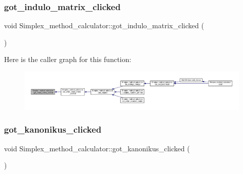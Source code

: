 \subsubsection{\texorpdfstring{got\+\_\+indulo\+\_\+matrix\+\_\+clicked}{got\_indulo\_matrix\_clicked}}
{\footnotesize\ttfamily void Simplex\+\_\+method\+\_\+calculator\+::got\+\_\+indulo\+\_\+matrix\+\_\+clicked (\begin{DoxyParamCaption}{ }\end{DoxyParamCaption})\hspace{0.3cm}{\ttfamily [signal]}}

Here is the caller graph for this function\+:\nopagebreak
\begin{figure}[H]
\begin{center}
\leavevmode
\includegraphics[width=350pt]{classSimplex__method__calculator_a4b3ebd66ccdae0e7750932c3d0538a5c_icgraph}
\end{center}
\end{figure}
\mbox{\label{classSimplex__method__calculator_a078f1874b0679d00afb935543b2c7da7}} 
\subsubsection{\texorpdfstring{got\+\_\+kanonikus\+\_\+clicked}{got\_kanonikus\_clicked}}
{\footnotesize\ttfamily void Simplex\+\_\+method\+\_\+calculator\+::got\+\_\+kanonikus\+\_\+clicked (\begin{DoxyParamCaption}{ }\end{DoxyParamCaption})\hspace{0.3cm}{\ttfamily [signal]}}

